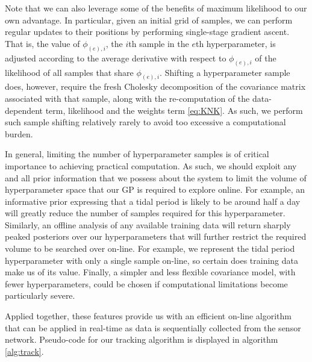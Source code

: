 \documentclass{acmtrans2m}
\begin{document}
Note that we can also leverage some of the benefits of maximum likelihood to our own advantage. In particular, given an initial grid of samples, we can perform regular updates to their positions by performing single-stage gradient ascent. That is, the value of $\phi_{(e),i}$, the $i$th sample in the $e$th hyperparameter, is adjusted according to the average derivative with respect to $\phi_{(e),i}$ of the likelihood of all samples that share $\phi_{(e),i}$. Shifting a hyperparameter sample does, however, require the fresh Cholesky decomposition of the covariance matrix associated with that sample, along with the re-computation of the data-dependent term, likelihood and the weights term \eqref{eq:KNK}. As such, we perform such sample shifting relatively rarely to avoid too excessive a computational burden.

In general, limiting the number of hyperparameter samples is of critical importance to achieving practical computation. As such, we should exploit any and all prior information that we possess about the system to limit the volume of hyperparameter space that our GP is required to explore online. For example, an informative prior expressing that a tidal period is likely to be around half a day will greatly reduce the number of samples required for this hyperparameter. Similarly, an offline analysis of any available training data will return sharply peaked posteriors over our hyperparameters that will further restrict the required volume to be searched over on-line. For example, we represent the tidal period hyperparameter with only a single sample on-line, so certain does training data make us of its value. Finally, a simpler and less flexible covariance model, with fewer hyperparameters, could be chosen if computational limitations become particularly severe. 

Applied together, these features provide us with an efficient on-line algorithm that can be applied in real-time as data is sequentially collected from the sensor network. Pseudo-code for our tracking algorithm is displayed in algorithm \ref{alg:track}.
\end{document}
